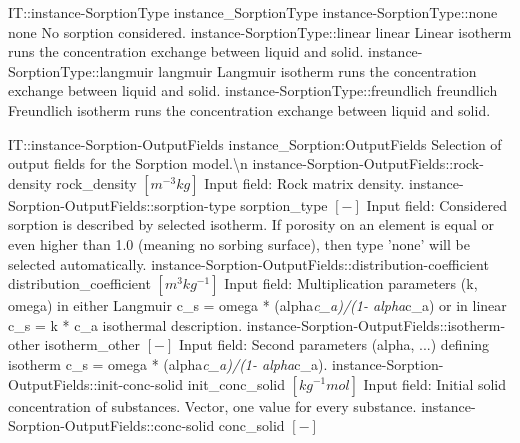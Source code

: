 \begin{SelectionType}
	{IT::instance-SorptionType}
	{instance{\_}SorptionType}
	{}
		\SelectionItem
			{instance-SorptionType::none}
			{none}
			{{{No sorption considered.}%
}}
		\SelectionItem
			{instance-SorptionType::linear}
			{linear}
			{{{Linear isotherm runs the concentration exchange between liquid and solid.}%
}}
		\SelectionItem
			{instance-SorptionType::langmuir}
			{langmuir}
			{{{Langmuir isotherm runs the concentration exchange between liquid and solid.}%
}}
		\SelectionItem
			{instance-SorptionType::freundlich}
			{freundlich}
			{{{Freundlich isotherm runs the concentration exchange between liquid and solid.}%
}}
\end{SelectionType}
\begin{SelectionType}
	{IT::instance-Sorption-OutputFields}
	{instance{\_}Sorption:OutputFields}
	{{{Selection of output fields for the Sorption model.{\textbackslash}n}%
}}
		\SelectionItem
			{instance-Sorption-OutputFields::rock-density}
			{rock{\_}density}
			{{{}{$[m^{-3}kg]$}{ Input field: Rock matrix density.}%
}}
		\SelectionItem
			{instance-Sorption-OutputFields::sorption-type}
			{sorption{\_}type}
			{{{}{$[-]$}{ Input field: Considered sorption is described by selected isotherm.
If porosity on an element is equal or even higher than 1.0 (meaning no sorbing surface), then type 'none' will be selected automatically.}%
}}
		\SelectionItem
			{instance-Sorption-OutputFields::distribution-coefficient}
			{distribution{\_}coefficient}
			{{{}{$[m^{3}kg^{-1}]$}{ Input field: Multiplication parameters (k, omega) in either Langmuir c{\_}s = omega * (alpha}\textit{c{\_}a)/(1- alpha}{c{\_}a) or in linear c{\_}s = k * c{\_}a isothermal description.}%
}}
		\SelectionItem
			{instance-Sorption-OutputFields::isotherm-other}
			{isotherm{\_}other}
			{{{}{$[-]$}{ Input field: Second parameters (alpha, ...) defining isotherm  c{\_}s = omega * (alpha}\textit{c{\_}a)/(1- alpha}{c{\_}a).}%
}}
		\SelectionItem
			{instance-Sorption-OutputFields::init-conc-solid}
			{init{\_}conc{\_}solid}
			{{{}{$[kg^{-1}mol]$}{ Input field: Initial solid concentration of substances.
Vector, one value for every substance.}%
}}
		\SelectionItem
			{instance-Sorption-OutputFields::conc-solid}
			{conc{\_}solid}
			{{{}{$[-]$}{ }%
}}
\end{SelectionType}
